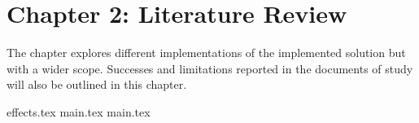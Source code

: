 \section{Chapter 2: Literature Review}
The chapter explores different implementations of the implemented solution but with a wider scope. Successes and limitations reported in the documents of study will also be outlined in this chapter.

{effects.tex}
{main.tex}
{main.tex}